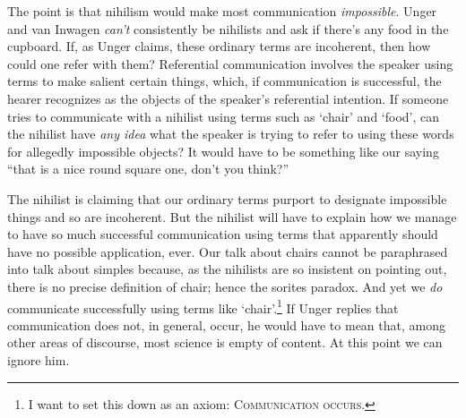 
The point is that nihilism would make most communication {\em impossible}. Unger and van Inwagen {\em can't} consistently be nihilists and ask if there's any food in the cupboard. If, as Unger claims, these ordinary terms are incoherent, then how could one refer with them? Referential communication involves the speaker using terms to make salient certain things, which, if communication is successful, the hearer recognizes as the objects of the speaker's referential intention. If someone tries to communicate with a nihilist using terms such as `chair' and `food', can the nihilist have {\em any idea} what the speaker is trying to refer to using these words for allegedly impossible objects? It would have to be something like our saying ``that is a nice round square one, don't you think?''%
%

The nihilist is claiming that our ordinary terms purport to designate impossible things and so are incoherent. But the nihilist will have to explain how we manage to have so much successful communication using terms that apparently should have no possible application, ever. Our talk about chairs cannot be paraphrased into talk about simples because, as the nihilists are so insistent on pointing out, there is no precise definition of chair; hence the sorites paradox. And yet we {\em do} communicate successfully using terms like `chair'.\footnote{I want to set this down as an axiom: \textsc{Communication occurs.}} If Unger replies that communication does not, in general, occur, he would have to mean that, among other areas of discourse, most science is empty of content. At this point we can ignore him.
%
%
%
%
%
